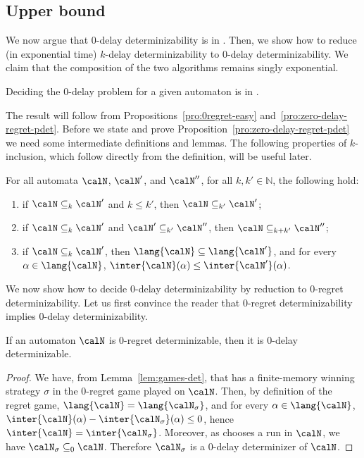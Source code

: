 \documentclass[a4paper]{article}
\begin{document}
\subsection{Upper bound}
We now argue that $0$-delay determinizability is in \EXP.  Then, we show how to
reduce (in exponential time) $k$-delay determinizability to $0$-delay
determinizability. We claim that the composition of the two algorithms remains
singly exponential.
\begin{proposition}\label{pro:0delay-in-exp}
	Deciding the $0$-delay problem for a given automaton is in
	\EXP.
\end{proposition}

The result will follow from Propositions~\ref{pro:0regret-easy}
and~\ref{pro:zero-delay-regret-pdet}.
Before we state and prove Proposition~\ref{pro:zero-delay-regret-pdet} we need
some intermediate definitions and lemmas. The following properties of
$k$-inclusion, which follow directly from 
the definition, will be useful later.
%
\begin{lemma}\label{lem:k-inc_prop}
	For all automata $\calN$, $\calN'$, and $\calN''$, for all $k,k' \in
	\mathbb{N}$, the following hold:
	\begin{enumerate}[nolistsep]
		\item\label{lem-item:k-inc_prop_less} if $\calN \subseteq_k \calN'$ and $k \le k'$, then
			$\calN \subseteq_{k'} \calN'$;
		\item\label{lem-item:k-inc_prop_trans} if $\calN
			\subseteq_{k} \calN'$ and $\calN' \subseteq_{k'}
			\calN''$, then $\calN \subseteq_{k + k'} \calN''$;
		\item\label{lem-item:k-inc_prop_sub} if $\calN \subseteq_k
			\calN'$, then $\lang{\calN} \subseteq
			\lang{\calN'}$, and for every $\alpha \in
			\lang{\calN}$, $\inter{\calN}(\alpha) \leq
			\inter{\calN'}(\alpha)$.
	\end{enumerate}
\end{lemma}

We now show how to decide $0$-delay determinizability by reduction to
$0$-regret determinizability.  Let us first convince the reader that $0$-regret
determinizability implies $0$-delay determinizability.

\begin{proposition}\label{pro:zero-delay-regret}
	If an automaton $\calN$ is $0$-regret determinizable, then it is
	$0$-delay determinizable.
\end{proposition}
\begin{proof}
	We have, from Lemma~\ref{lem:games-det}, that \eve has a finite-memory
	winning strategy $\sigma$ in the $0$-regret game played on $\calN$.
	Then, by definition of the regret game, $\lang{\calN} =
	\lang{\calN_\sigma}$, and for every $\alpha \in
	\lang{\calN}$, $\inter{\calN}(\alpha) -
	\inter{\calN_\sigma}(\alpha) \leq 0$, hence $\inter{\calN} =
	\inter{\calN_\sigma}$. Moreover, as \eve chooses a run in
	$\calN$, we have $\calN_\sigma \subseteq_0 \calN$.  Therefore
	$\calN_\sigma$ is a $0$-delay determinizer of $\calN$.
\end{proof}
\end{document}
